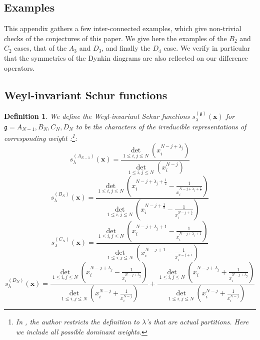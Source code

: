 \documentclass[12pt]{amsart}
\newtheorem{defn}[thm]{Definition}
\newcommand{\bx}{{\mathbf x}}
\numberwithin{equation}{section}
\numberwithin{table}{section}
\begin{document}
\begin{appendix}
\section{Examples}

This appendix gathers a few inter-connected examples, which give non-trivial checks of the conjectures of this paper.
We give here the examples of the $B_2$ and $C_2$ cases, that of the $A_3$ and $D_3$,
and finally the $D_4$ case. We verify in particular that the symmetries of the Dynkin diagrams are also reflected on our difference operators.

\subsection{Weyl-invariant Schur functions}

\begin{defn}
We define the Weyl-invariant Schur functions 
$s^{({\mathfrak g})}_\lambda(\bx)$ for ${\mathfrak g}=A_{N-1},B_N,C_N,D_N$ to be the characters of the irreducible representations
of corresponding weight \cite{Mizu}:\footnote{In \cite{Mizu}, the author restricts the definition to $\lambda$'s that are actual partitions. Here we include all possible dominant weights.}:
\begin{equation}
 s^{(A_{N-1})}_\lambda(\bx)=
\frac{\det_{1\leq i,j\leq N}\left( x_i^{N-j+\lambda_j}\right)}
{\det_{1\leq i,j\leq N}\left(  x_i^{N-j}\right)} \label{ANschur}
\end{equation}
\begin{equation}
s^{(B_N)}_\lambda(\bx)=
\frac{\det_{1\leq i,j\leq N}\left( x_i^{N-j+\lambda_j+\frac{1}{2}}-\frac{1}{x_i^{N-j+\lambda_j+\frac{1}{2}}}\right)}
{\det_{1\leq i,j\leq N}\left(  x_i^{N-j+\frac{1}{2}}-\frac{1}{x_i^{N-j+\frac{1}{2}}}\right)} \label{BNschur} 
\end{equation}
\begin{equation}
 s^{(C_N)}_\lambda(\bx)=\frac{\det_{1\leq i,j\leq N}\left( x_i^{N-j+\lambda_j+1}-\frac{1}{x_i^{N-j+\lambda_j+1}}\right)}
{\det_{1\leq i,j\leq N}\left(  x_i^{N-j+1}-\frac{1}{x_i^{N-j+1}}\right)} \label{CNschur}
\end{equation}
\begin{equation}
 s^{(D_N)}_\lambda(\bx)= 
\frac{\det_{1\leq i,j\leq N}\left( x_i^{N-j+\lambda_j}-\frac{1}{x_i^{N-j+\lambda_j}}\right)}
{\det_{1\leq i,j\leq N}\left(  x_i^{N-j}+\frac{1}{x_i^{N-j}}\right)}
+\frac{\det_{1\leq i,j\leq N}\left( x_i^{N-j+\lambda_j}+\frac{1}{x_i^{N-j+\lambda_j}}\right)}
{\det_{1\leq i,j\leq N}\left(  x_i^{N-j}+\frac{1}{x_i^{N-j}}\right)}\label{DNschur} 
\end{equation}
\end{defn}


\end{appendix}
\end{document}
